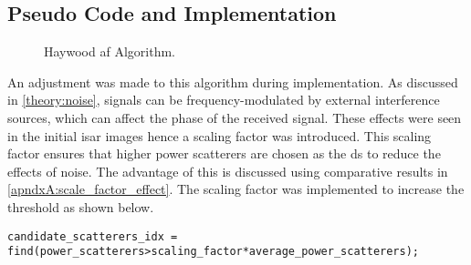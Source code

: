 \documentclass[class=report,11pt,crop=false]{standalone}
\begin{document}
    \subsection{Pseudo Code and Implementation}
    \begin{figure}[ht]
      \vspace{0.5cm}
      \centering
      \captionsetup{type=figure}
      \begin{minipage}{.7\linewidth}
        \begin{algorithm}[H]
            \caption{Haywood \gls{af} Algorithm.\label{alg:haywood_AF}}
    
            \DontPrintSemicolon
            \SetAlgoLined
    
    
            \BlankLine
          \vspace{0.5cm}
        \end{algorithm}
      \end{minipage}
    \end{figure}

    An adjustment was made to this algorithm during implementation. As discussed in \autoref{theory:noise}, signals can be frequency-modulated by external interference sources, which can affect the phase of the received signal. These effects were seen in the initial \gls{isar} images hence a scaling factor was introduced. This scaling factor ensures that higher power scatterers are chosen as the \gls{ds} to reduce the effects of noise. The advantage of this is discussed using comparative results in \autoref{apndxA:scale_factor_effect}. The scaling factor was implemented to increase the threshold as shown below.
    
\begin{lstlisting}[caption={\textsc{Matlab} code for selecting candidate dominant scatterers.},label={code:scale_factor}]
candidate_scatterers_idx = find(power_scatterers>scaling_factor*average_power_scatterers);
\end{lstlisting}
\end{document}
